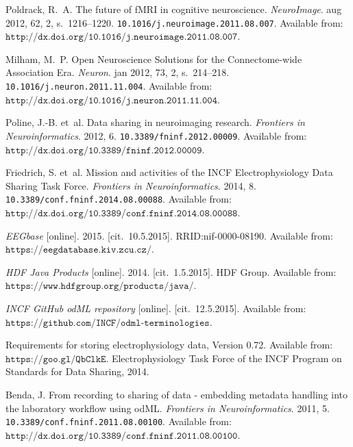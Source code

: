 \documentclass[conference]{IEEEtran}
\begin{document}
\begin{thebibliography}{1}


{\sc Poldrack}, R.~A.
\newblock The future of {fMRI} in cognitive neuroscience.
\newblock \emph{{NeuroImage}}. aug 2012, 62, 2, s.~1216--1220.
\newblock \texttt{10.1016/j.neuroimage.2011.08.007}.
\newblock Available from:
$\texttt{{http://dx.doi.org/10.1016/j.neuroimage.2011.08.007}}$.

{\sc Milham}, M.~P.
\newblock Open Neuroscience Solutions for the Connectome-wide Association Era.
\newblock \emph{Neuron}. jan 2012, 73, 2, s.~214--218.
\newblock \texttt{10.1016/j.neuron.2011.11.004}.
\newblock Available from:
$\texttt{{http://dx.doi.org/10.1016/j.neuron.2011.11.004}}$.

{\sc Poline}, J.-B. et~al.
\newblock Data sharing in neuroimaging research.
\newblock \emph{Frontiers in Neuroinformatics}. 2012, 6.
\newblock \texttt{10.3389/fninf.2012.00009}.
\newblock Available from:
$\texttt{{http://dx.doi.org/10.3389/fninf.2012.00009}}$.

{\sc Friedrich}, S. et~al.
\newblock Mission and activities of the {INCF} Electrophysiology Data Sharing
Task Force.
\newblock \emph{Frontiers in Neuroinformatics}. 2014, 8.
\newblock \texttt{10.3389/conf.fninf.2014.08.00088}.
\newblock Available from:
$\texttt{{http://dx.doi.org/10.3389/conf.fninf.2014.08.00088}}$.


\emph{EEGbase} [online]. 2015. [cit.~10.5.2015]. RRID:nif-0000-08190.
\newblock Available from: $\texttt{{https://eegdatabase.kiv.zcu.cz/}}$.


\emph{HDF Java Products} [online]. 2014. [cit.~1.5.2015]. HDF Group.
\newblock Available from: $\texttt{{https://www.hdfgroup.org/products/java/}}$.



\emph{INCF GitHub odML repository} [online]. [cit.~12.5.2015].
\newblock Available from:
$\texttt{{https://github.com/INCF/odml-terminologies}}$.


Requirements for storing electrophysiology data, Version 0.72.
\newblock Available from: $\texttt{{https://goo.gl/QbClkE}}$.
\newblock Electrophysiology Task Force of the INCF Program on Standards for
Data Sharing, 2014.

{\sc Benda}, J.
\newblock From recording to sharing of data - embedding metadata handling into
the laboratory workflow using {odML}.
\newblock \emph{Frontiers in Neuroinformatics}. 2011, 5.
\newblock \texttt{10.3389/conf.fninf.2011.08.00100}.
\newblock Available from:
$\texttt{{http://dx.doi.org/10.3389/conf.fninf.2011.08.00100}}$.


\end{thebibliography}
\end{document}

